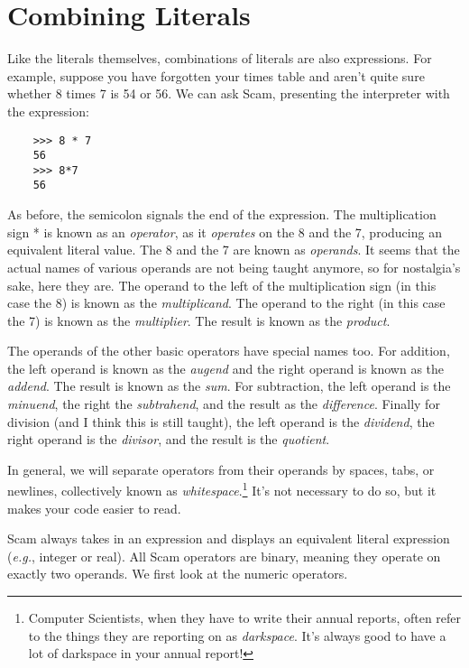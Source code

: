 \chapter{Combining Literals}
\label{CombiningLiterals}

Like the literals themselves, combinations of literals are also
expressions. For example, suppose you have forgotten your times table
and aren't quite sure whether 8 times 7 is 54 or 56. We can ask Scam,
presenting the interpreter with the expression:

\begin{verbatim}
    >>> 8 * 7
    56
    >>> 8*7
    56
\end{verbatim}

As before, the semicolon signals the end of the expression. The
multiplication sign * is known as an {\it operator}, as it {\it operates} on the 8
and the 7, producing an equivalent literal value. The 8 and the 7 are
known as {\it operands}. It seems that the actual names of various operands are
not being taught anymore, so for nostalgia's sake, here they are. The
operand to the left of the multiplication sign (in this case the 8) is
known as the {\it multiplicand}. The operand to the right (in this case the 7)
is known as the {\it multiplier}. The result is known as the {\it product}.

The operands of the other basic operators
have special names too. For addition, the left operand is known as the
{\it augend} and the right operand is known as the {\it addend}.
The result is known as the {\it sum}.
For subtraction,
the left operand is the {\it minuend}, the right the {\it subtrahend}, and
the result as the {\it difference}.
Finally
for division (and I think this is still taught), the left operand is
the {\it dividend}, the right operand is the {\it divisor}, and the 
result is the {\it quotient}.

In general, we will separate
operators from their operands by
spaces, tabs,
or newlines, collectively known as {\it whitespace}.\footnote{
Computer Scientists, when they have to write their annual reports,
often refer to the things they are reporting on as
{\it darkspace}. It's always good to have a lot of darkspace in
your annual report!
}
It's not necessary to do so, but it  makes your code
easier to read.

Scam always takes in an expression and displays an equivalent
literal expression ({\it e.g.}, integer or real). All Scam operators are
binary, meaning they operate on exactly two operands. We first look at
the numeric operators.

